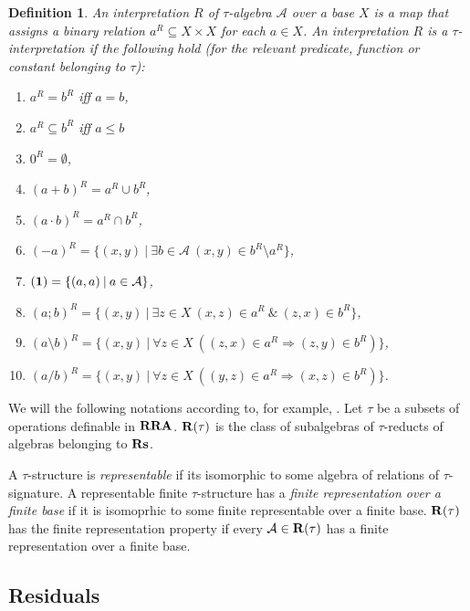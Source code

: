 \documentclass[a4paper]{article}
\theoremstyle{defin}
\newtheorem{defin}{Definition}
\theoremstyle{theorem}
\theoremstyle{prop}
\theoremstyle{lemma}
\theoremstyle{ex}
\theoremstyle{col}
\theoremstyle{claim}
\begin{document}
\begin{defin}
  An interpretation $R$ of $\tau$-algebra $\mathcal{A}$ over a base $X$ is a map that assigns a binary relation $a^R \subseteq X \times X$
  for each $a \in X$. An interpretation $R$ is a $\tau$-interpretation if the following hold
  (for the relevant predicate, function or constant belonging to $\tau$):
  \begin{enumerate}
    \item $a^R = b^R$ iff $a = b$,
    \item $a^R \subseteq b^R$ iff $a \leq b$
    \item $0^{R} = \emptyset$,
    \item $(a + b)^{R} = a^R \cup b^R$,
    \item $(a \cdot b)^{R} = a^R \cap b^R$,
    \item $(- a)^R = \{ (x, y) \: | \: \exists b \in \mathcal{A} \: (x, y) \in b^R \setminus a^R \}$,
    \item $({\bf 1}) = \{ (a, a) \: | \: a \in \mathcal{A} \}$,
    \item $(a;b)^R = \{ (x, y) \: | \: \exists z \in X \: (x, z) \in a^R \: \& \: (z, x) \in b^R \}$,
    \item $(a \setminus b)^{R} = \{ (x, y) \: | \: \forall z \in X \: ((z, x) \in a^R \Rightarrow (z, y) \in b^R)\}$,
    \item $(a / b)^{R} = \{ (x, y) \: | \: \forall z \in X \: ((y, z) \in a^R \Rightarrow (x, z) \in b^R)\}$.
  \end{enumerate}
\end{defin}

We will the following notations according to, for example, \cite{hirsch2011positive}. Let $\tau$ be a subsets of operations definable in ${\bf RRA}$. ${\bf R}(\tau)$ is the class of subalgebras of $\tau$-reducts of algebras belonging to ${\bf Rs}$.

A $\tau$-structure is \emph{representable} if its isomorphic to some algebra of relations of $\tau$-signature. A representable
finite $\tau$-structure has a \emph{finite representation over a finite base} if it is isomoprhic to some finite representable over a
finite base.
${\bf R}(\tau)$ has the finite representation property if every $\mathcal{A} \in {\bf R}(\tau)$ has a finite representation over a
finite base.

\subsection{Residuals}
\end{document}
